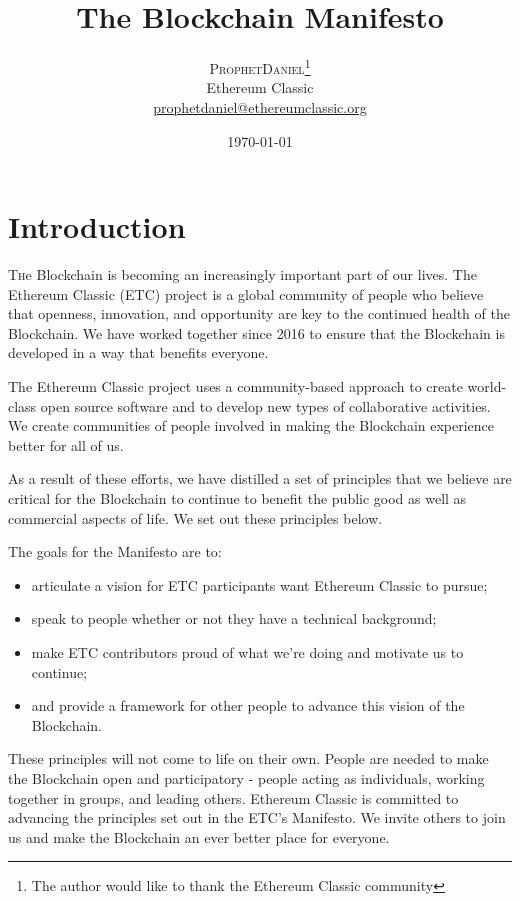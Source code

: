 \documentclass[twoside,twocolumn]{article}
\title{The Blockchain Manifesto} %
\author{%
\textsc{ProphetDaniel}\thanks{The author would like to thank the Ethereum Classic community} \\[1ex] %
\normalsize Ethereum Classic \\ %
\normalsize
\href{mailto:prophetdaniel@ethereumclassic.org}{prophetdaniel@ethereumclassic.org}
}
\date{\today} %
\begin{document}
\maketitle


\section{Introduction}

\lettrine[nindent=0em,lines=3]{T}he Blockchain is becoming an increasingly
important part of our lives. The Ethereum Classic (ETC) project is a global community of people who believe that openness, innovation, and opportunity are key to the continued health of the Blockchain. We have
worked together since 2016 to ensure that the Blockchain is developed in a way
that benefits everyone.

The Ethereum Classic project uses a community-based approach to
create world-class open source software and to develop new types of
collaborative activities. We create communities of people involved in making the
Blockchain experience better for all of us.

As a result of these efforts, we have distilled a set of principles that we
believe are critical for the Blockchain to continue to benefit the public good
as well as commercial aspects of life. We set out these principles below.

The goals for the Manifesto are to:

\begin{itemize}
  \item articulate a vision for ETC participants want
  Ethereum Classic to pursue;
  \item speak to people whether or not they have a technical
background;
  \item make ETC contributors proud of what we're doing and motivate us
to continue;
  \item and provide a framework for other people to advance this vision of
the Blockchain.
\end{itemize}

These principles will not come to life on their own. People are needed to make
the Blockchain open and participatory - people acting as individuals, working
together in groups, and leading others. Ethereum Classic is
committed to advancing the principles set out in the ETC's Manifesto. We
invite others to join us and make the Blockchain an ever better place for
everyone.
\end{document}
